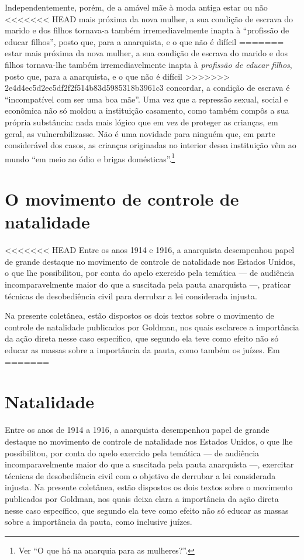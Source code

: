 Independentemente, porém, de a amável mãe à moda antiga estar ou não
<<<<<<< HEAD
mais próxima da nova mulher, a sua condição de escrava do marido e
dos filhos tornava-a também irremediavelmente inapta à ``profissão de
educar filhos'', posto que, para a anarquista, e o que não é difícil
=======
estar mais próxima da nova mulher, a sua condição de escrava do marido e
dos filhos tornava-lhe também irremediavelmente inapta à \textit{profissão de
educar filhos}, posto que, para a anarquista, e o que não é difícil
>>>>>>> 2e4d4ec5d2ec5df2f2f514b83d5985318b3961c3
concordar, a condição de escrava é ``incompatível com ser uma boa mãe''.
Uma vez que a repressão sexual, social e econômica não só moldou a
instituição casamento, como também compôs a sua própria substância:
nada mais lógico que em vez de proteger as crianças, em geral, as
vulnerabilizasse. Não é uma novidade para ninguém que, em parte
considerável dos casos, as crianças originadas no interior dessa
instituição vêm ao mundo ``em meio ao ódio e brigas domésticas''.\footnote{Ver ``O
que há na anarquia para as mulheres?''.}

\section{O movimento de controle de natalidade}

<<<<<<< HEAD
Entre os anos 1914 e 1916, a anarquista desempenhou papel de grande
destaque no movimento de controle de natalidade nos Estados Unidos, o
que lhe possibilitou, por conta do apelo exercido pela temática --- de
audiência incomparavelmente maior do que a suscitada pela pauta
anarquista ---, praticar técnicas de desobediência civil para
derrubar a lei considerada injusta.

Na presente coletânea, estão
dispostos os dois textos sobre o movimento de controle de natalidade
publicados por Goldman, nos quais esclarece a importância da ação
direta nesse caso específico, que segundo ela teve como efeito não só
educar as massas sobre a importância da pauta, como também os juízes. Em
=======
\section{Natalidade}

Entre os anos de 1914 a 1916, a anarquista desempenhou papel de grande
destaque no movimento de controle de natalidade nos Estados Unidos, o
que lhe possibilitou, por conta do apelo exercido pela temática --- de
audiência incomparavelmente maior do que a suscitada pela pauta
anarquista ---, exercitar técnicas de desobediência civil com o objetivo
de derrubar a lei considerada injusta. Na presente coletânea, estão
dispostos os dois textos sobre o movimento publicados por Goldman, nos quais deixa clara a importância da ação
direta nesse caso específico, que segundo ela teve como efeito não só
educar as massas sobre a importância da pauta, como inclusive juízes. 

